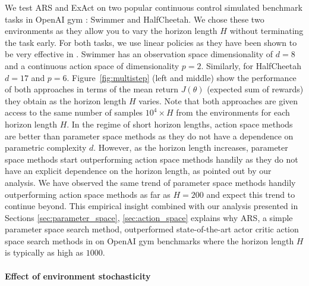 We test ARS and ExAct on two popular continuous control simulated
benchmark tasks in OpenAI gym \citep{openaigym}: Swimmer and
HalfCheetah. We chose these two environments as they allow you to vary
the horizon length $H$ without terminating the task early. For both
tasks, we use linear policies as they have been shown to be very
effective in \citep{mania2018simple, rajeswaran2017towards}. Swimmer
has an observation space dimensionality of $d = 8$ and a continuous
action space of dimensionality $p = 2$. Similarly, for HalfCheetah
$d=17$ and $p=6$. Figure~\ref{fig:multistep} (left and middle) show the
performance of both approaches in terms of the mean return $J(\theta)$ (expected sum of
rewards) they obtain as the horizon length $H$ varies. 
%
%
%
Note that both
approaches are given access to the same number of samples $10^4 \times
H$ from the environments for each horizon length $H$. In the regime of
short horizon lengths, action space methods are better than parameter
space methods as they do not have a dependence on parametric
complexity $d$. However, as the horizon length increases, parameter
space methods start outperforming action space methods handily as they
do not have an explicit dependence on the horizon length, as pointed out
by our analysis. We have observed the same trend of parameter space
methods handily outperforming action space methods as far as $H =
200$ and expect this trend to continue beyond. This empirical insight
combined with our analysis presented in 
Sections \ref{sec:parameter_space}, \ref{sec:action_space} explains
why ARS, a simple parameter space search method, outperformed
state-of-the-art actor critic action space search methods in
\citep{mania2018simple} on OpenAI gym benchmarks where the horizon
length $H$ is typically as high as $1000$. 
%
\paragraph{Effect of environment stochasticity}
\label{sec:effect-stoch-param}

